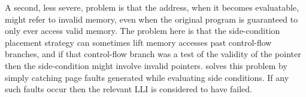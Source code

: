 A second, less severe, problem is that the address, when it becomes
evaluatable, might refer to invalid memory, even when the original
program is guaranteed to only ever access valid memory.  The problem
here is that the side-condition placement strategy can sometimes lift
memory accesses past control-flow branches, and if that control-flow
branch was a test of the validity of the pointer then the
side-condition might involve invalid pointers.  {\Implementation}
solves this problem by simply catching page faults generated while
evaluating side conditions.  If any such faults occur then the
relevant LLI is considered to have failed.

